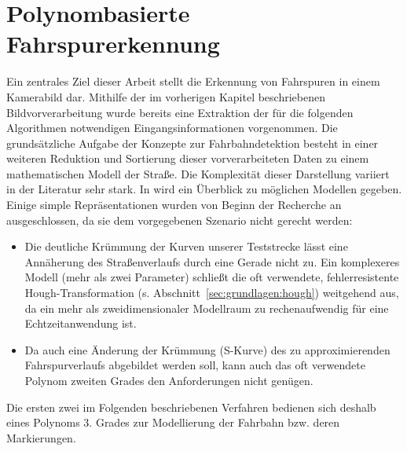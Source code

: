 \chapter{Polynombasierte Fahrspurerkennung \dcsecondauthorshort}
\label{cha:fahrspurerkennung}
Ein zentrales Ziel dieser Arbeit stellt die Erkennung von Fahrspuren in einem Kamerabild dar. Mithilfe der im vorherigen Kapitel beschriebenen Bildvorverarbeitung wurde bereits eine Extraktion der für die folgenden Algorithmen notwendigen Eingangsinformationen vorgenommen. Die grundsätzliche Aufgabe der Konzepte zur Fahrbahndetektion besteht in einer weiteren Reduktion und Sortierung dieser vorverarbeiteten Daten zu einem mathematischen Modell der Straße. Die Komplexität dieser Darstellung variiert in der Literatur sehr stark. In \autocite{naroteReviewRecentAdvances2018} wird ein Überblick zu möglichen Modellen gegeben. Einige simple Repräsentationen wurden von Beginn der Recherche an ausgeschlossen, da sie dem vorgegebenen Szenario nicht gerecht werden: 
\begin{itemize}
\item Die deutliche Krümmung der Kurven unserer Teststrecke lässt eine Annäherung des Straßenverlaufs durch eine Gerade nicht zu. Ein komplexeres Modell (mehr als zwei Parameter) schließt die oft verwendete, fehlerresistente Hough-Transformation (s. Abschnitt~\ref{sec:grundlagen:hough}) weitgehend aus, da ein mehr als zweidimensionaler Modellraum zu rechenaufwendig für eine Echtzeitanwendung ist. 
\item Da auch eine Änderung der Krümmung (S-Kurve) des zu approximierenden Fahrspurverlaufs abgebildet werden soll, kann auch das oft verwendete Polynom zweiten Grades den Anforderungen nicht genügen. 
\end{itemize}
Die ersten zwei im Folgenden beschriebenen Verfahren bedienen sich deshalb eines Polynoms 3. Grades zur Modellierung der Fahrbahn bzw. deren Markierungen. 

